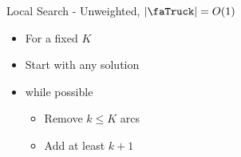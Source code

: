 \begin{frame}{Local Search - Unweighted, $|\text{\faTruck}| = O(1)$}
\begin{itemize}[<+->]
  \item For a fixed $K$
  \item Start with any solution
  \item while possible
  	\begin{itemize}
  	  \item Remove $k \leq K$ arcs
  	  \item Add at least $k+1$
	\end{itemize}
\end{itemize}
\end{frame}